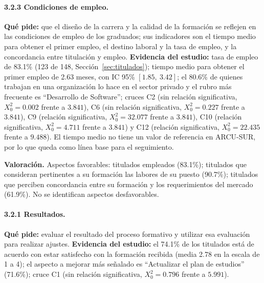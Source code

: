 \paragraph{3.2.3 Condiciones de empleo.} \textbf{Qué pide:} que el diseño de la carrera y la calidad de la formación se reflejen en las condiciones de empleo de los graduados; sus indicadores son el tiempo medio para obtener el primer empleo, el destino laboral y la tasa de empleo, y la concordancia entre titulación y empleo. \textbf{Evidencia del estudio:} tasa de empleo de 83.1\% (123 de 148, Sección~\ref{sec:titulados}); tiempo medio para obtener el primer empleo de 2.63 meses, con IC 95\% $[1.85,\ 3.42]$; el 80.6\% de quienes trabajan en una organización lo hace en el sector privado y el rubro más frecuente es ``Desarrollo de Software''; cruces C2 (sin relación significativa, $X_0^2 = 0.002$ frente a $3.841$), C6 (sin relación significativa, $X_0^2 = 0.227$ frente a $3.841$), C9 (relación significativa, $X_0^2 = 32.077$ frente a $3.841$), C10 (relación significativa, $X_0^2 = 4.711$ frente a $3.841$) y C12 (relación significativa, $X_0^2 = 22.435$ frente a $9.488$). El tiempo medio no tiene un valor de referencia en ARCU-SUR, por lo que queda como línea base para el seguimiento.

\textbf{Valoración.} Aspectos favorables: titulados empleados (83.1\%); titulados que consideran pertinentes a su formación las labores de su puesto (90.7\%); titulados que perciben concordancia entre su formación y los requerimientos del mercado (61.9\%). No se identifican aspectos desfavorables.

\paragraph{3.2.1 Resultados.} \textbf{Qué pide:} evaluar el resultado del proceso formativo y utilizar esa evaluación para realizar ajustes. \textbf{Evidencia del estudio:} el 74.1\% de los titulados está de acuerdo con estar satisfecho con la formación recibida (media 2.78 en la escala de 1 a 4); el aspecto a mejorar más señalado es ``Actualizar el plan de estudios'' (71.6\%); cruce C1 (sin relación significativa, $X_0^2 = 0.796$ frente a $5.991$).

